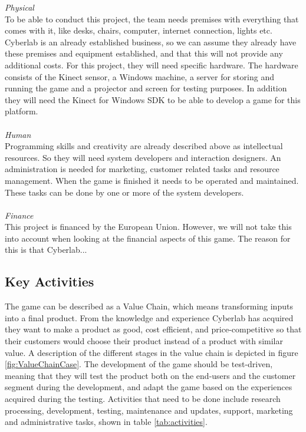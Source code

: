 \emph{Physical} \\ To be able to conduct this project, the team needs premises with everything that comes with it, like desks, chairs, computer, internet connection, lights etc. Cyberlab is an already established business, so we can assume they already have these premises and equipment established, and that this will not provide any additional costs. For this project, they will need specific hardware. The hardware consists of the Kinect sensor, a Windows machine, a server for storing and running the game and a projector and screen for testing purposes. In addition they will need the Kinect for Windows SDK to be able to develop a game for this platform.\\ \\
\emph{Human} \\ Programming skills and creativity are already described above as intellectual resources. So they will need system developers and interaction designers. An administration is needed for marketing, customer related tasks and resource management. When the game is finished it needs to be operated and maintained. These tasks can be done by one or more of the system developers. \\ \\
\emph{Finance} \\ This project is financed by the European Union. However, we will not take this into account when looking at the financial aspects of this game. The reason for this is that Cyberlab...

\subsection{Key Activities}
The game can be described as a Value Chain, which means transforming inputs into a final product. From the knowledge and experience Cyberlab has acquired they want to make a product as good, cost efficient, and price-competitive so that their customers would choose their product instead of a product with similar value. A description of the different stages in the value chain is depicted in figure \ref{fig:ValueChainCase}. The development of the game should be test-driven, meaning that they will test the product both on the end-users and the customer segment during the development, and adapt the game based on the experiences acquired during the testing. Activities that need to be done include research processing, development, testing, maintenance and updates, support, marketing and administrative tasks, shown in table \ref{tab:activities}. 


